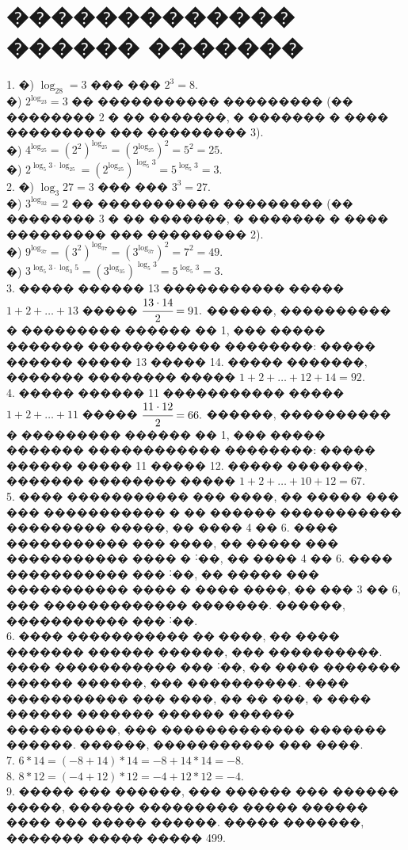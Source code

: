 \documentclass[12pt]{article}
\begin{document}
\section{������������� ������ �������}
1. �) $\log_28=3$ ��� ��� $2^3=8.$\\
�) $2^{\log_23}=3$ �� ����������� ��������� (�� �������� 2 � �� �������, � ������� � ���� ��������� ��� ��������� 3).\\
�) $4^{\log_25}=(2^2)^{\log_25}=(2^{\log_25})^2=5^2=25.$\\
�) $2^{\log_5 3\cdot\log_25}=(2^{\log_25})^{\log_5 3}=5^{\log_5 3}=3.$\\
2. �) $\log_3 27=3$ ��� ��� $3^3=27.$\\
�) $3^{\log_32}=2$ �� ����������� ��������� (�� �������� 3 � �� �������, � ������� � ���� ��������� ��� ��������� 2).\\
�) $9^{\log_37}=(3^2)^{\log_37}=(3^{\log_37})^2=7^2=49.$\\
�) $3^{\log_5 3\cdot\log_3 5}=(3^{\log_35})^{\log_5 3}=5^{\log_5 3}=3.$\\
3. ����� ������ 13 ����������� ����� $1+2+\ldots+13$ ����� $\cfrac{13\cdot14}{2}=91.$ ������, ���������� � ��������� ������ �� 1, ��� ����� ������� ������������ ��������: ����� ������ ����� 13 ����� 14. ����� �������, ������� �������� ����� $1+2+\ldots+12+14=92.$\\
4. ����� ������ 11 ����������� ����� $1+2+\ldots+11$ ����� $\cfrac{11\cdot12}{2}=66.$ ������, ���������� � ��������� ������ �� 1, ��� ����� ������� ������������ ��������: ����� ������ ����� 11 ����� 12. ����� �������, ������� �������� ����� $1+2+\ldots+10+12=67.$\\
5. ���� ����������� ��� ����, �� ����� ��� ��� ����������� � �� ������ ����������� ��������� �����, �� ���� 4 �� 6. ���� ����������� ��� ����, �� ����� ��� ����������� ���� � ˸��, �� ���� 4 �� 6. ���� ����������� ��� ˸��, �� ����� ��� ����������� ���� � ���� ����, �� ��� 3 �� 6, ��� ������������� �������. ������, ����������� ��� ˸��.\\
6. ���� ����������� �� ����, �� ���� ������� ������ ������, ��� ����������. ���� ����������� ��� ˸��, ��  ���� ������� ������ ������, ��� ����������. ���� ����������� ��� ����, �� �� ���, � ���� ������ ������� ������ ������ ����������, ��� ������������� ������� ������. ������, ����������� ��� ����.\\
7. $6*14=(-8+14)*14=-8+14*14=-8.$\\
8. $8*12=(-4+12)*12=-4+12*12=-4.$\\
9. ����� ��� ������, ��� ������ ��� ������ �����, ������ ��������� ����� ������ ���� ��� ����� ������. ����� �������, ������� ����� ����� 499.\\
\end{document}
